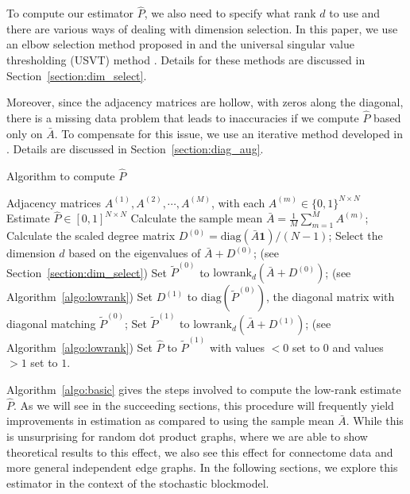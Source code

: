 \documentclass[10pt,letterpaper]{article}
\renewcommand{\hat}{\widehat}
\begin{document}
To compute our estimator $\hat{P}$, we also need to specify what rank $d$ to use and there are various ways of dealing with dimension selection. 
In this paper, we use an elbow selection method proposed in \citet{zhu2006automatic} and the universal singular value thresholding (USVT) method \citep{chatterjee2015matrix}. 
Details for these methods are discussed in Section~\ref{section:dim_select}.

Moreover, since the adjacency matrices are hollow, with zeros along the diagonal, there is a missing data problem that leads to inaccuracies if we compute $\hat{P}$ based only on $\bar{A}$. 
To compensate for this issue, we use an iterative method developed in \citet{scheinerman2010modeling}. 
Details are discussed in Section~\ref{section:diag_aug}.


\begin{algorithm}[H]
\caption{Algorithm to compute $\hat{P}$}
\label{algo:basic}
\begin{algorithmic}[1]
\REQUIRE Adjacency matrices $A^{(1)}, A^{(2)}, \cdots, A^{(M)}$, with each $A^{(m)} \in \{0,1\}^{N \times N}$
\ENSURE Estimate $\hat{P}\in[0,1]^{N\times N}$
\STATE Calculate the sample mean $\bar{A} = \frac{1}{M}\sum\limits_{m = 1}^M A^{(m)}$;
\STATE Calculate the scaled degree matrix $D^{(0)} = \mathrm{diag}(\bar{A} \bm{1})/(N-1)$;
\STATE Select the dimension $d$ based on the eigenvalues of $\bar{A} + D^{(0)}$; (see Section~\ref{section:dim_select})
\STATE Set $\tilde{P}^{(0)}$ to $\mathrm{lowrank}_d(\bar{A} + D^{(0)})$; (see Algorithm~\ref{algo:lowrank})
\STATE Set $D^{(1)}$ to $ \mathrm{diag}(\tilde{P}^{(0)})$, the diagonal matrix with diagonal matching $\tilde{P}^{(0)}$; 
\STATE Set $\tilde{P}^{(1)}$ to $\mathrm{lowrank}_d(\bar{A} + D^{(1)})$; (see Algorithm~\ref{algo:lowrank})
\STATE Set $\hat{P}$ to $\tilde{P}^{(1)}$ with values $<0$ set to $0$ and values $>1$ set to $1$.
\end{algorithmic}
\end{algorithm}


Algorithm~\ref{algo:basic} gives the steps involved to compute the low-rank estimate $\hat{P}$.
As we will see in the succeeding sections, this procedure will frequently yield improvements in estimation as compared to using the sample mean $\bar{A}$.
While this is unsurprising for random dot product graphs, where we are able to show theoretical results to this effect, we also see this effect for connectome data and more general independent edge graphs.
In the following sections, we explore this estimator in the context of the stochastic blockmodel.
\end{document}
